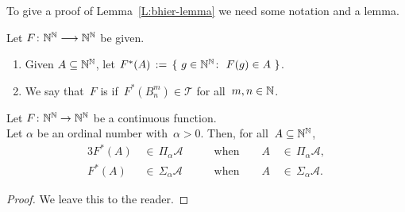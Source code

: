To give a proof of Lemma~\ref{L:bhier-lemma}
we need some notation and a lemma.
\begin{dfn}
\label{D:bhier-continuous}
Let $F\colon \mathbb{N}^{\mathbb{N}}\longrightarrow \mathbb{N}^{\mathbb{N}}$
be given.
\begin{enumerate}
\item
Given $A\subseteq \mathbb{N}^{\mathbb{N}}$,
let
$F^*(A)\,:=\,\{\ g\in \mathbb{N}^{\mathbb{N}}\colon \ F(g)\in A\ \}$.
\item
We say that~$F$ is 
if~$F^*(B^m_n) \in \mathcal{T}$
for all~$m,n\in \mathbb{N}$.
\end{enumerate}
\end{dfn}
\begin{lem}
\label{L:bhier-continuous}
Let $F\colon \mathbb{N}^{\mathbb{N}}\rightarrow \mathbb{N}^{\mathbb{N}}$ be a continuous function.\\
Let $\alpha$ be an ordinal number with~$\alpha>0$.
Then, for all~$A\subseteq\mathbb{N}^{\mathbb{N}}$,
\begin{alignat*}{3}
F^*(A) \,&\in\, \Pi_\alpha\mathcal{A}&
\qquad\text{when}\qquad A\,&\in\,\Pi_\alpha\mathcal{A}, \\
F^*(A) \,&\in\, \Sigma_\alpha\mathcal{A}&
\qquad\text{when}\qquad A\,&\in\,\Sigma_\alpha\mathcal{A}.
\end{alignat*}
\end{lem}
\begin{proof}
We leave this to the reader.
\end{proof}


